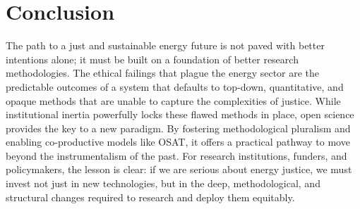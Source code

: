 \documentclass[11pt, letterpaper, twocolumn]{article}
\begin{document}
\section{Conclusion}

The path to a just and sustainable energy future is not paved with better intentions alone; it must be built on a foundation of better research methodologies. The ethical failings that plague the energy sector are the predictable outcomes of a system that defaults to top-down, quantitative, and opaque methods that are unable to capture the complexities of justice. While institutional inertia powerfully locks these flawed methods in place, open science provides the key to a new paradigm. By fostering methodological pluralism and enabling co-productive models like OSAT, it offers a practical pathway to move beyond the instrumentalism of the past. For research institutions, funders, and policymakers, the lesson is clear: if we are serious about energy justice, we must invest not just in new technologies, but in the deep, methodological, and structural changes required to research and deploy them equitably.



\end{document}
